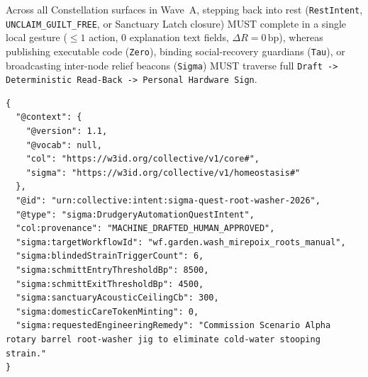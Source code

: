\begin{invariant}
\label{inv:wave-a-asymmetric-friction}
Across all Constellation surfaces in Wave~A, stepping back into rest (\texttt{RestIntent}, \texttt{UNCLAIM\_GUILT\_FREE}, or Sanctuary Latch closure) MUST complete in a single local gesture ($\le 1$ action, $0$ explanation text fields, $\Delta R = 0\,\mathrm{bp}$), whereas publishing executable code (\texttt{Zero}), binding social-recovery guardians (\texttt{Tau}), or broadcasting inter-node relief beacons (\texttt{Sigma}) MUST traverse full \texttt{Draft -> Deterministic Read-Back -> Personal Hardware Sign}.
\end{invariant}

\begin{lstlisting}[language=jsonld,caption={Canonical Wave A JSON-LD \texttt{DrudgeryAutomationQuestIntent} routing chronic ergonomic strain into a Scenario \texttt{Alpha}/\texttt{Zero} automation quest without exposing personal somatic data.}]
{
  "@context": {
    "@version": 1.1,
    "@vocab": null,
    "col": "https://w3id.org/collective/v1/core#",
    "sigma": "https://w3id.org/collective/v1/homeostasis#"
  },
  "@id": "urn:collective:intent:sigma-quest-root-washer-2026",
  "@type": "sigma:DrudgeryAutomationQuestIntent",
  "col:provenance": "MACHINE_DRAFTED_HUMAN_APPROVED",
  "sigma:targetWorkflowId": "wf.garden.wash_mirepoix_roots_manual",
  "sigma:blindedStrainTriggerCount": 6,
  "sigma:schmittEntryThresholdBp": 8500,
  "sigma:schmittExitThresholdBp": 4500,
  "sigma:sanctuaryAcousticCeilingCb": 300,
  "sigma:domesticCareTokenMinting": 0,
  "sigma:requestedEngineeringRemedy": "Commission Scenario Alpha rotary barrel root-washer jig to eliminate cold-water stooping strain."
}
\end{lstlisting}

